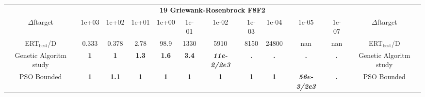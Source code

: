 \begin{tabular}{cccccccccccc}
 & \multicolumn{10}{c}{{\normalsize \textbf{19 Griewank-Rosenbrock F8F2}}}\\
$\Delta$ftarget& 1e+03& 1e+02& 1e+01& 1e+00& 1e-01& 1e-02& 1e-03& 1e-04& 1e-05& 1e-07 & $\Delta$ftarget \\
ERT$_{\textrm{best}}$/D& 0.333& 0.378& 2.78& 98.9& 1330& 5910& 8150& 24800& nan& nan & ERT$_{\textrm{best}}$/D \\
\hline
Genetic Algoritm study & \textbf{1} & \textbf{1} & \textbf{1.3} & \textbf{1.6} & \textbf{3.4} & \textbf{\textit{11e-2}\textit{/2e3}} & \textbf{.} & \textbf{.} & \textbf{.} & \textbf{.} & Genetic Algoritm study \cite{add_an_entry_for_Genetic Algoritm study_in_bbob.bib}\\
PSO Bounded & \textbf{1} & \textbf{1.1} & \textbf{1} & \textbf{1} & \textbf{1} & \textbf{1} & \textbf{1} & \textbf{1} & \textbf{\textit{56e-3}\textit{/2e3}} & \textbf{.} & PSO Bounded \cite{add_an_entry_for_PSO Bounded_in_bbob.bib}
\end{tabular}
